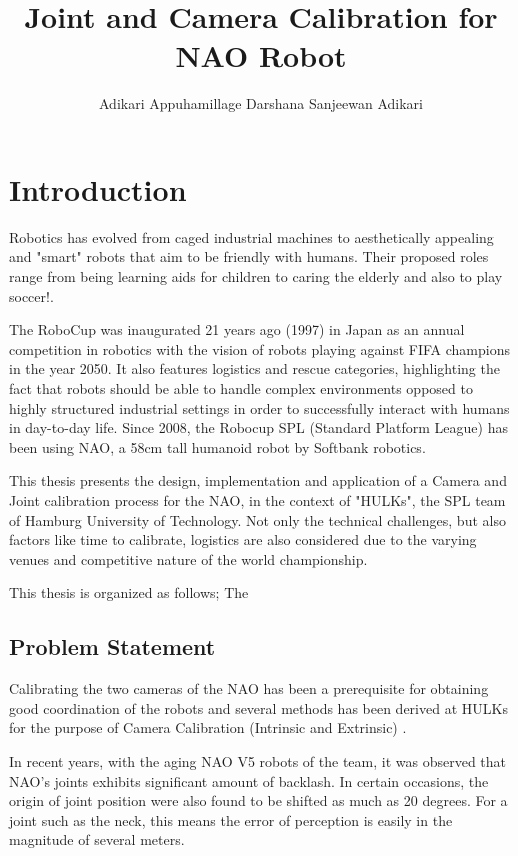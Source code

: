 \documentclass[english, printversion, nomenclature, notitle]{tuvisionthesis} %
\author{Adikari Appuhamillage Darshana Sanjeewan Adikari}
\title{Joint and Camera Calibration for NAO Robot}
\begin{document}
\hypersetup{
	pdfauthor=\@author\relax,
	pdftitle=\@title\relax
}
\tuvisionheading
\hypersetup{pageanchor=true}
\clearpage{\thispagestyle{empty}\cleardoublepage}

\chapter{Introduction}

Robotics has evolved from caged industrial machines to aesthetically appealing and "smart" robots that aim to be friendly with humans. Their proposed roles range from being learning aids for children to caring the elderly and also to play soccer!.

The RoboCup was inaugurated 21 years ago (1997) in Japan as an annual competition in robotics with the vision of robots playing against FIFA champions in the year 2050. It also features  logistics and rescue categories, highlighting  the fact that robots should be able to handle complex environments opposed to highly structured industrial settings in order to successfully interact with humans in day-to-day life.  Since 2008, the Robocup SPL (Standard Platform League) has been using NAO, a 58cm tall humanoid robot by Softbank robotics.

This thesis presents the design, implementation and application of a Camera and Joint calibration process for the NAO, in the context of "HULKs", the SPL team of Hamburg University of Technology. Not only the technical challenges, but also factors like time to calibrate, logistics are also considered due to the varying venues and competitive nature of the world championship.

This thesis is organized as follows; The 

\section{Problem Statement}

Calibrating the two cameras of the NAO has been a prerequisite for obtaining good coordination of the robots and several methods has been derived at HULKs for the purpose of Camera Calibration (Intrinsic and Extrinsic) \cite{darshana_adikari_team_2017}.

In recent years, with the aging NAO V5 robots of the team, it was observed that NAO's joints exhibits significant amount of backlash. In certain occasions, the origin of joint position were also found to be shifted as much as 20 degrees. For a joint such as the neck, this means the error of perception is easily in the magnitude of several meters.
\end{document}
